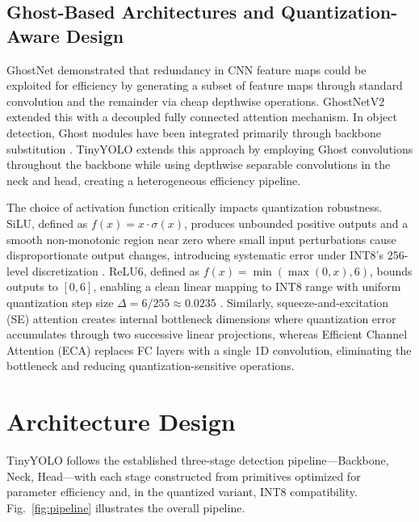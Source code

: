 \documentclass[journal]{IEEEtran}
\begin{document}
\subsection{Ghost-Based Architectures and Quantization-Aware Design}
GhostNet \cite{han2020ghostnet} demonstrated that redundancy in CNN feature maps could be exploited for efficiency by generating a subset of feature maps through standard convolution and the remainder via cheap depthwise operations. GhostNetV2 \cite{tang2022ghostnetv2} extended this with a decoupled fully connected attention mechanism. In object detection, Ghost modules have been integrated primarily through backbone substitution \cite{chen2023ghostdet, wang2022lightweight}. TinyYOLO extends this approach by employing Ghost convolutions throughout the backbone while using depthwise separable convolutions in the neck and head, creating a heterogeneous efficiency pipeline.

The choice of activation function critically impacts quantization robustness. SiLU, defined as $f(x) = x \cdot \sigma(x)$, produces unbounded positive outputs and a smooth non-monotonic region near zero where small input perturbations cause disproportionate output changes, introducing systematic error under INT8's 256-level discretization \cite{nagel2021white, banner2019post}. ReLU6, defined as $f(x) = \min(\max(0, x), 6)$, bounds outputs to $[0, 6]$, enabling a clean linear mapping to INT8 range with uniform quantization step size $\Delta = 6/255 \approx 0.0235$ \cite{sandler2018mobilenetv2}. Similarly, squeeze-and-excitation (SE) attention \cite{hu2018squeeze} creates internal bottleneck dimensions where quantization error accumulates through two successive linear projections, whereas Efficient Channel Attention (ECA) \cite{wang2020eca} replaces FC layers with a single 1D convolution, eliminating the bottleneck and reducing quantization-sensitive operations.

\section{Architecture Design}
TinyYOLO follows the established three-stage detection pipeline---Backbone, Neck, Head---with each stage constructed from primitives optimized for parameter efficiency and, in the quantized variant, INT8 compatibility. Fig.~\ref{fig:pipeline} illustrates the overall pipeline.
\end{document}
